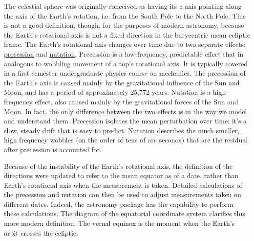 The celestial sphere was originally conceived as having its $z$ axis pointing along the axis of the Earth's rotation, i.e. from the South Pole to the North Pole.
This is not a good definition, though, for the purposes of modern astronomy, 
because the Earth's rotational axis is not a fixed direction in the barycentric mean ecliptic frame.
The Earth's rotational axis changes over time due to two separate effects: 
\href{https://en.wikipedia.org/wiki/Axial_precession}{precession} and \href{https://en.wikipedia.org/wiki/Astronomical_nutation}{nutation}.
Precession is a low-frequency, predictable effect that in analogous to wobbling movement of a top's rotational axis.
It is typically covered in a first semester undergraduate physics course on mechanics.
The precession of the Earth's axis is caused mainly by the gravitational influence of the Sun and Moon, and has a period of approximately 25,772 years.
Nutation is a high-frequency effect, also caused mainly by the gravitational forces of the Sun and Moon.
In fact, the only difference between the two effects is in the way we model and understand them.
Precession isolates the mean perturbation over time; it's a slow, steady drift that is easy to predict.
Nutation describes the much smaller, high frequency wobbles (on the order of tens of arc seconds) that are the residual after precession is accounted for.

Because of the instability of the Earth's rotational axis, the definition of the directions were updated to refer to the mean equator as of a date,
rather than Earth's rotational axis when the measurement is taken.
Detailed calculations of the precession and nutation can then be used to adjust measurements taken on different dates.
Indeed, the  astronomy package has the capability to perform these calculations.
The diagram of the equatorial coordinate system clarifies this more modern definition.  
The vernal equinox is the moment when the Earth's orbit crosses the ecliptic.

